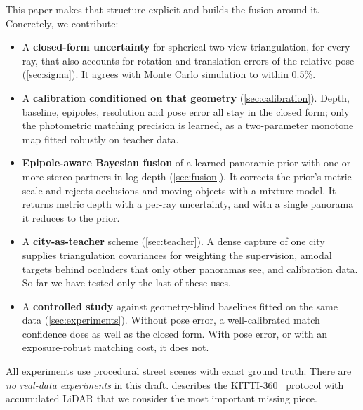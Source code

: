 This paper makes that structure explicit and builds the fusion around it. Concretely, we contribute:
\begin{itemize}
  \item A \textbf{closed-form uncertainty} for spherical two-view triangulation, for every ray, that
  also accounts for rotation and translation errors of the relative pose (\cref{sec:sigma}). It agrees
  with Monte Carlo simulation to within 0.5\%.
  \item A \textbf{calibration conditioned on that geometry} (\cref{sec:calibration}). Depth, baseline,
  epipoles, resolution and pose error all stay in the closed form; only the photometric matching
  precision is learned, as a two-parameter monotone map fitted robustly on teacher data.
  \item \textbf{Epipole-aware Bayesian fusion} of a learned panoramic prior with one or more stereo
  partners in log-depth (\cref{sec:fusion}). It corrects the prior's metric scale and rejects
  occlusions and moving objects with a mixture model. It returns metric depth with a per-ray
  uncertainty, and with a single panorama it reduces to the prior.
  \item A \textbf{city-as-teacher} scheme (\cref{sec:teacher}). A dense capture of one city supplies
  triangulation covariances for weighting the supervision, amodal targets behind occluders that only
  other panoramas see, and calibration data. So far we have tested only the last of these uses.
  \item A \textbf{controlled study} against geometry-blind baselines fitted on the same data
  (\cref{sec:experiments}). Without pose error, a well-calibrated match confidence does as well as the
  closed form. With pose error, or with an exposure-robust matching cost, it does not.
\end{itemize}
All experiments use procedural street scenes with exact ground truth. There are \emph{no real-data
experiments} in this draft.  describes the KITTI-360~\cite{liao2022kitti360}
protocol with accumulated LiDAR that we consider the most important missing piece.
